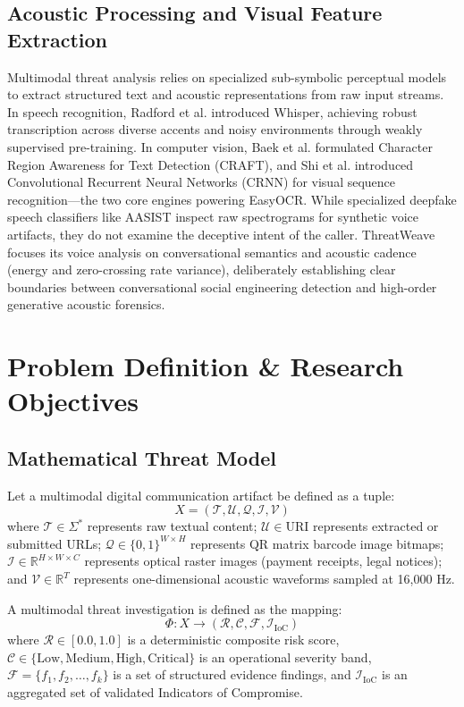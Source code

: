 \documentclass[conference]{IEEEtran}
\begin{document}
\subsection{Acoustic Processing and Visual Feature Extraction}
Multimodal threat analysis relies on specialized sub-symbolic perceptual models to extract structured text and acoustic representations from raw input streams. In speech recognition, Radford et al. \cite{radford2023whisper} introduced Whisper, achieving robust transcription across diverse accents and noisy environments through weakly supervised pre-training. In computer vision, Baek et al. \cite{baek2019craft} formulated Character Region Awareness for Text Detection (CRAFT), and Shi et al. \cite{shi2017crnn} introduced Convolutional Recurrent Neural Networks (CRNN) for visual sequence recognition—the two core engines powering EasyOCR. While specialized deepfake speech classifiers like AASIST \cite{jung2022aasist} inspect raw spectrograms for synthetic voice artifacts, they do not examine the deceptive intent of the caller. ThreatWeave focuses its voice analysis on conversational semantics and acoustic cadence (energy and zero-crossing rate variance), deliberately establishing clear boundaries between conversational social engineering detection and high-order generative acoustic forensics.

\section{Problem Definition \& Research Objectives}
\subsection{Mathematical Threat Model}
Let a multimodal digital communication artifact be defined as a tuple:
\begin{equation}
X = (\mathcal{T}, \mathcal{U}, \mathcal{Q}, \mathcal{I}, \mathcal{V})
\end{equation}
where $\mathcal{T} \in \Sigma^*$ represents raw textual content; $\mathcal{U} \in \text{URI}$ represents extracted or submitted URLs; $\mathcal{Q} \in \{0, 1\}^{W \times H}$ represents QR matrix barcode image bitmaps; $\mathcal{I} \in \mathbb{R}^{H \times W \times C}$ represents optical raster images (payment receipts, legal notices); and $\mathcal{V} \in \mathbb{R}^T$ represents one-dimensional acoustic waveforms sampled at 16,000 Hz.

A multimodal threat investigation is defined as the mapping:
\begin{equation}
\Phi: X \longrightarrow \left(\mathcal{R}, \mathcal{C}, \mathcal{F}, \mathcal{I}_{\text{IoC}}\right)
\end{equation}
where $\mathcal{R} \in [0.0, 1.0]$ is a deterministic composite risk score, $\mathcal{C} \in \{\text{Low}, \text{Medium}, \text{High}, \text{Critical}\}$ is an operational severity band, $\mathcal{F} = \{f_1, f_2, \dots, f_k\}$ is a set of structured evidence findings, and $\mathcal{I}_{\text{IoC}}$ is an aggregated set of validated Indicators of Compromise.
\end{document}
